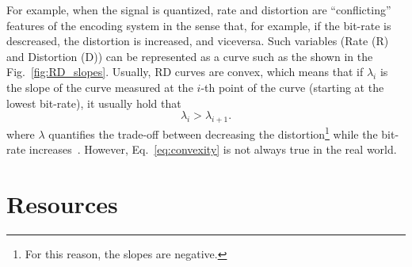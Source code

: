 For example, when the signal is quantized, rate and distortion are
``conflicting'' features of the encoding system in the sense that, for
example, if the bit-rate is descreased, the distortion is increased,
and viceversa. Such variables (Rate (R) and Distortion (D)) can be
represented as a curve such as the shown in the
Fig.~\ref{fig:RD_slopes}. Usually, RD curves are convex, which means
that if $\lambda_i$ is the slope of the curve measured at the $i$-th
point of the curve (starting at the lowest bit-rate), it usually hold
that
\begin{equation}
  \lambda_i > \lambda_{i+1}.
  \label{eq:convexity}
\end{equation}
where $\lambda$ quantifies the trade-off between decreasing the
distortion\footnote{For this reason, the slopes are negative.} while
the bit-rate
increases~\cite{vetterli1995wavelets,sayood2017introduction}. However,
Eq.~\eqref{eq:convexity} is not always true in the real world.


\section{Resources}
\renewcommand{\addcontentsline}[3]{}%

